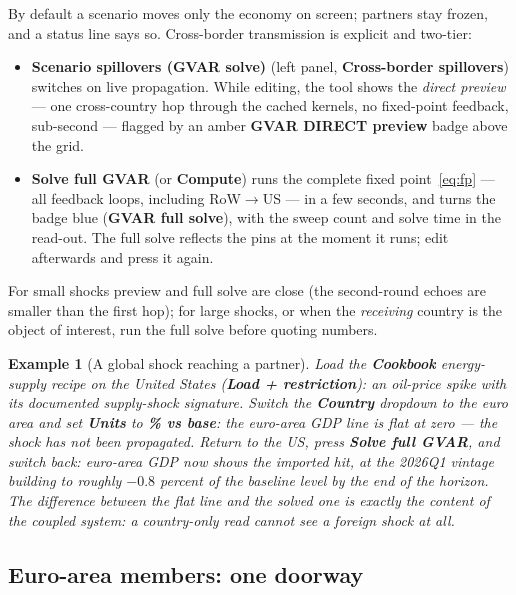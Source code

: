 \documentclass[11pt]{article}
\newcommand{\ui}[1]{\textbf{#1}}
\theoremstyle{plain}
\newtheorem{example}{Example}
\theoremstyle{remark}
\begin{document}
By default a scenario moves only the economy on screen; partners stay
frozen, and a status line says so. Cross-border transmission is explicit
and two-tier:
\begin{itemize}
  \item \ui{Scenario spillovers (GVAR solve)} (left panel,
    \ui{Cross-border spillovers}) switches on live propagation. While
    editing, the tool shows the \emph{direct preview} --- one
    cross-country hop through the cached kernels, no fixed-point
    feedback, sub-second --- flagged by an amber \ui{GVAR DIRECT
    preview} badge above the grid.
  \item \ui{Solve full GVAR} (or \ui{Compute}) runs the complete fixed
    point~\eqref{eq:fp} --- all feedback loops, including
    RoW$\to$US --- in a few seconds, and turns the badge blue
    (\ui{GVAR full solve}), with the sweep count and solve time in the
    read-out. The full solve reflects the pins at the moment it runs;
    edit afterwards and press it again.
\end{itemize}
For small shocks preview and full solve are close (the second-round
echoes are smaller than the first hop); for large shocks, or when the
\emph{receiving} country is the object of interest, run the full solve
before quoting numbers.

\begin{example}[A global shock reaching a partner]\label{ex:energy}
Load the \ui{Cookbook} energy-supply recipe on the United States
(\ui{Load + restriction}): an oil-price spike with its documented
supply-shock signature. Switch the \ui{Country} dropdown to the euro
area and set \ui{Units} to \ui{\% vs base}: the euro-area GDP line is
flat at zero --- the shock has not been propagated. Return to the US,
press \ui{Solve full GVAR}, and switch back: euro-area GDP now shows the
imported hit, at the 2026Q1 vintage building to roughly
$-0.8$ percent of the baseline level by the end of the horizon. The
difference between the flat line and the solved one is exactly the
content of the coupled system: a country-only read cannot see a foreign
shock at all.
\end{example}

\subsection{Euro-area members: one doorway}\label{sec:eamembers}
\end{document}
